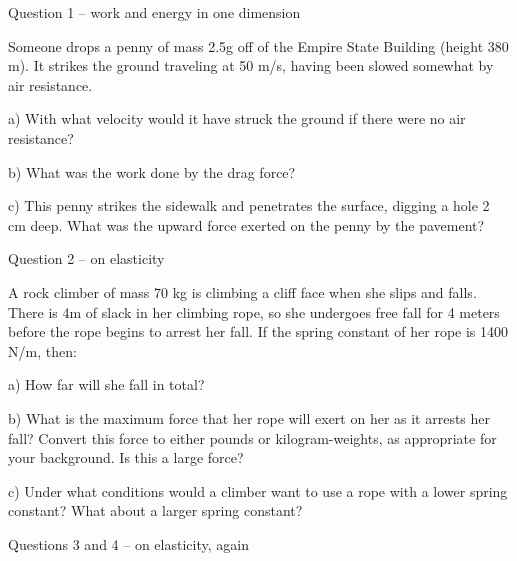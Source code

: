 \documentclass[12pt]{article}
\begin{document}
\Large
\centerline{}
\normalsize
\centerline{}
\small

\medskip

\centerline{\large Question 1 -- work and energy in one dimension}

\medskip

Someone drops a penny of mass 2.5g off of the Empire State Building (height 380 m). It strikes the ground traveling at 50 m/s, having been slowed somewhat by air resistance.


\vspace{1in}

a) With what velocity would it have struck the ground if there were no air resistance? 

\vspace{2in}

b) What was the work done by the drag force?

\vspace{2in}

c) This penny strikes the sidewalk and penetrates the surface, digging a hole 2 cm deep. What was the upward force
exerted on the penny by the pavement? 

\newpage

\centerline{\large Question 2 -- on elasticity}

\medskip

A rock climber of mass 70 kg is climbing a cliff face when she slips and falls. 
There is 4m of slack in her climbing rope, so she undergoes free fall for 4 meters before the 
rope begins to arrest her fall. If the spring constant of her rope is 1400 N/m, then:

\vspace{1in}

a) How far will she fall in total?

\vspace{2in}

b) What is the maximum force that her rope will exert on her as it arrests her fall? Convert this force to either pounds or
kilogram-weights, as appropriate for your background. Is this a large force?

\vspace{2in}

c) Under what conditions would a climber want to use a rope with a lower spring constant? What about a larger spring constant?

\newpage

\centerline{\large Questions 3 and 4 -- on elasticity, again}
\end{document}
